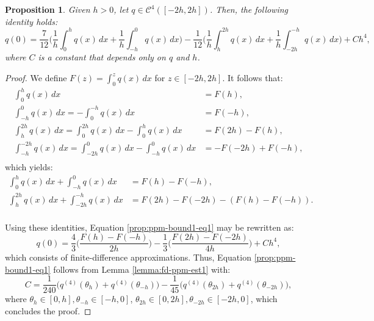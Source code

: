 \theoremstyle{plain} %
\newtheorem{lema}{Lemma}[chapter]


\theoremstyle{plain} %
\newtheorem{prop}{Proposition}[chapter]

\begin{prop}
	\label{prop:ppm-bound1}
	Given $h>0$, let $q \in \mathcal{C}^{4}([-2h,2h])$. Then, the following identity
	holds:
	\begin{equation}
		\label{prop:ppm-bound1-eq1}
		q(0) = \frac{7}{12}\bigg( \frac{1}{h} \int_{0}^{h} q(x) \,dx 
		       + \frac{1}{h} \int_{-h}^{0} q(x) \,dx  \bigg)
		       - \frac{1}{12}\bigg( \frac{1}{h} \int_{h}^{2h} q(x) \,dx 
		       + \frac{1}{h} \int_{-2h}^{-h} q(x) \,dx  \bigg) + Ch^4,
	\end{equation}
	where $C$ is a constant that depends only on $q$ and $h$.
\end{prop}

\begin{proof}
	We define $F(z) = \int_{0}^{z} q(x) \,dx $ for $z \in [-2h, 2h]$. 
	It follows that:
	\begin{align*}
		\int_{ 0}^{h}   q(x) \,dx &= F(h),\\
		\int_{-h}^{0}   q(x) \,dx = -\int_{ 0}^{-h} q(x)  \,dx  &= F(-h),\\ 
		\int_{ h}^{2h}  q(x) \,dx =  \int_{ 0}^{2h} q(x)  \,dx - \int_{ 0}^{h} q(x) \,dx  &= F(2h) - F(h),\\ 
		\int_{-h}^{-2h} q(x) \,dx =  \int_{-2h }^{0} q(x) \,dx - \int_{-h}^{0} q(x) \,d x&= -F(-2h) + F(-h),\\ 
	\end{align*}
	which yields:
	\begin{align*}
		\int_{0}^{h} q(x) \,dx + \int_{-h}^{0} q(x) \,dx &=
		F(h) - F(-h), \\
		\int_{h}^{2h} q(x) \,dx + \int_{-2h}^{-h} q(x) \,dx &=
		F(2h) - F(-2h) - (F(h) - F(-h)). \\
	\end{align*}
	
	Using these identities, Equation \eqref{prop:ppm-bound1-eq1} may be rewritten as:
	\begin{equation}
		\label{prop:ppm-bound1-eq2}
		q(0) = \frac{4}{3} \bigg(\frac{F(h) - F(-h)}{2h}\bigg)
		       - \frac{1}{3} \bigg(\frac{F(2h) - F(-2h)}{4h}\bigg)
+ Ch^4,
	\end{equation}
	which consists of finite-difference approximations. 
	Thus, Equation \eqref{prop:ppm-bound1-eq1} follows from Lemma \ref{lemma:fd-ppm-est1}
	with:
	\begin{equation}
		\label{prop:ppm-bound1-eq3}
		C = \frac{1}{240}\bigg( q^{(4)}(\theta_{h}) + q^{(4)}(\theta_{-h})\bigg)
		- \frac{1}{45}\bigg( q^{(4)}(\theta_{2h}) + q^{(4)}(\theta_{-2h})\bigg), 
	\end{equation}
	where $\theta_{h} \in [0,h], \theta_{-h}\in [-h,0]$, 
	$\theta_{2h} \in [0,2h], \theta_{-2h}\in [-2h,0]$,
	which concludes the proof.

  \renewcommand\qedsymbol{} %
\end{proof}